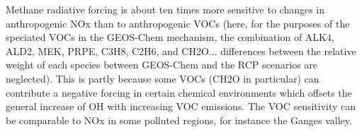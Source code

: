 
Methane radiative forcing is about ten times more sensitive to changes in anthropogenic NOx than to anthropogenic VOCs (here, for the purposes of the speciated VOCs in the GEOS-Chem mechanism, the combination of ALK4, ALD2, MEK, PRPE, C3H8, C2H6, and CH2O... differences between the relative weight of each species between GEOS-Chem and the RCP scenarios are neglected). This is partly because some VOCs (CH2O in particular) can contribute a negative forcing in certain chemical environments which offsets the general increase of OH with increasing VOC emissions. The VOC sensitivity can be comparable to NOx in some polluted regions, for instance the Ganges valley.

